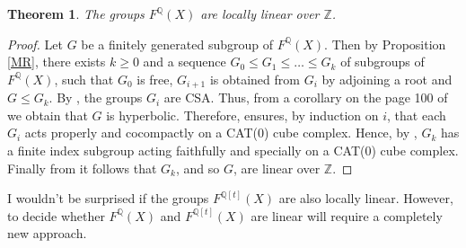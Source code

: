 \documentclass[11pt]{amsart}
\newtheorem{teo}[lem]{Theorem}
\numberwithin{claimcounter}{lem}
\newcommand{\Z}{\mathbb{Z}}
\newcommand{\Q}{\mathbb{Q}}
\begin{document}
\begin{teo} \label{linear} The groups $F^{\Q}(X)$ are locally linear over $\Z$.
\end{teo}
\begin{proof} Let $G$ be a finitely generated subgroup of $F^{\Q}(X)$. Then  by Proposition \ref{MR}, there exists $k\ge 0$ and   a sequence $G_0\le G_1\le \ldots\le  G_k$ of subgroups of $F^{\Q}(X)$,  such that $G_0$ is free, $G_{i+1}$ is obtained from $G_i$ by adjoining a root and $G\le G_k$. By \cite[Theorem 5]{MR96}, the groups $G_i$ are CSA. Thus, from a corollary on the page 100 of \cite{BF92} we obtain that $G$ is hyperbolic.   Therefore,  \cite[Corollary C]{HW15} ensures, by induction on $i$, that each $G_i$ acts properly and cocompactly on a CAT(0) cube complex. Hence, by \cite[Theorem 1.1]{Ag13},  $G_k$ has a finite index subgroup acting faithfully and specially on a CAT(0) cube complex.
 Finally from \cite[Theorem 1.1]{HW08} it follows that $G_k$, and so $G$,  are linear over $\Z$.\end{proof}
I wouldn't be surprised if the groups $F^{\Q[t]}(X)$ are also locally linear. However, to decide whether $F^{\Q}(X)$ and $F^{\Q[t]}(X)$ are linear will require a completely new approach.
\end{document}
